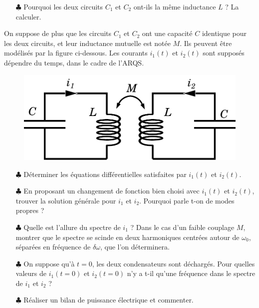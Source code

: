 \documentclass{report}
\begin{document}
\begin{itemize}

	\item[$\clubsuit$] Pourquoi les deux circuits $C_1$ et $C_2$ ont-ils la même inductance $L$ ? La calculer. 
	
\end{itemize}

On suppose de plus que les circuits $C_1$ et $C_2$ ont une capacité $C$ identique pour les deux circuits, et leur inductance mutuelle est notée $M$. Ils peuvent être modélisés par la figure ci-dessous. Les courants $i_1(t)$ et $i_2(t)$ sont supposés dépendre du temps, dans le cadre de l'ARQS.

\begin{figure}[h!]
\centering
		\includegraphics[scale=0.45]{induction_mutuelle2.pdf}
\end{figure}

\begin{itemize}

	
	\item[$\clubsuit$] Déterminer les équations différentielles satisfaites par $i_1(t)$ et $i_2(t)$.
	
	\item[$\clubsuit$] En proposant un changement de fonction bien choisi avec $i_1(t)$ et $i_2(t)$, trouver la solution générale pour $i_1$ et $i_2$. Pourquoi parle t-on de modes propres ?
	
	\item[$\clubsuit$] Quelle est l'allure du spectre de $i_1$ ? Dans le cas d'un faible couplage $M$, montrer que le spectre se scinde en deux harmoniques centrées autour de $\omega_0$, séparées en fréquence de $\delta\omega$, que l'on déterminera.  
	
	\item[$\clubsuit$] On suppose qu'à $t=0$, les deux condensateurs sont déchargés. Pour quelles valeurs de $i_1(t=0)$ et $i_2(t=0)$ n'y a t-il qu'une fréquence dans le spectre de $i_1$ et $i_2$ ?
	
	\item[$\clubsuit$] Réaliser un bilan de puissance électrique et commenter. 	
	
\end{itemize}	
\end{document}
